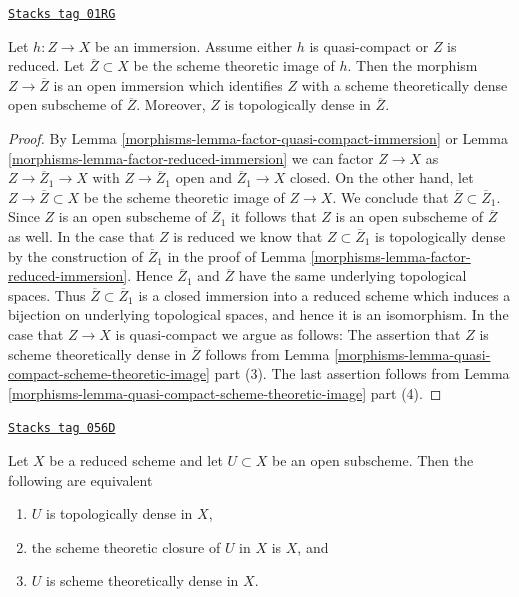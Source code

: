\begin{lemma}
\label{morphisms-lemma-quasi-compact-immersion}
\href{https://stacks.math.columbia.edu/tag/01RG}{\texttt{Stacks tag 01RG}}

Let $h : Z \to X$ be an immersion. Assume either $h$ is quasi-compact
or $Z$ is reduced. Let $\overline{Z} \subset X$ be the scheme theoretic
image of $h$. Then the morphism $Z \to \overline{Z}$ is an open immersion
which identifies $Z$ with a scheme theoretically dense open
subscheme of $\overline{Z}$. Moreover, $Z$ is topologically
dense in $\overline{Z}$.
\end{lemma}

\begin{proof}

By Lemma \ref{morphisms-lemma-factor-quasi-compact-immersion} or
Lemma \ref{morphisms-lemma-factor-reduced-immersion} we can factor
$Z \to X$ as $Z \to \overline{Z}_1 \to X$ with $Z \to \overline{Z}_1$
open and $\overline{Z}_1 \to X$ closed. On the other hand, let
$Z \to \overline{Z} \subset X$ be the scheme theoretic image of
$Z \to X$. We conclude that $\overline{Z} \subset \overline{Z}_1$.
Since $Z$ is an open subscheme of $\overline{Z}_1$ it follows
that $Z$ is an open subscheme of $\overline{Z}$ as well.
In the case that $Z$ is reduced we know that $Z \subset \overline{Z}_1$
is topologically dense by the construction of $\overline{Z}_1$ in
the proof of Lemma \ref{morphisms-lemma-factor-reduced-immersion}.
Hence $\overline{Z}_1$ and $\overline{Z}$ have the same
underlying topological spaces. Thus $\overline{Z} \subset \overline{Z}_1$
is a closed immersion into a reduced scheme which induces a bijection
on underlying topological spaces, and hence it is an isomorphism.
In the case that $Z \to X$ is quasi-compact we argue as follows:
The assertion that $Z$ is scheme theoretically dense in
$\overline{Z}$ follows from
Lemma \ref{morphisms-lemma-quasi-compact-scheme-theoretic-image} part (3).
The last assertion follows from
Lemma \ref{morphisms-lemma-quasi-compact-scheme-theoretic-image} part (4).
\end{proof}

\begin{lemma}
\label{morphisms-lemma-reduced-scheme-theoretically-dense}
\href{https://stacks.math.columbia.edu/tag/056D}{\texttt{Stacks tag 056D}}

Let $X$ be a reduced scheme and let $U \subset X$ be an open subscheme.
Then the following are equivalent
\begin{enumerate}
\item $U$ is topologically dense in $X$,
\item the scheme theoretic closure of $U$ in $X$ is $X$, and
\item $U$ is scheme theoretically dense in $X$.
\end{enumerate}
\end{lemma}

